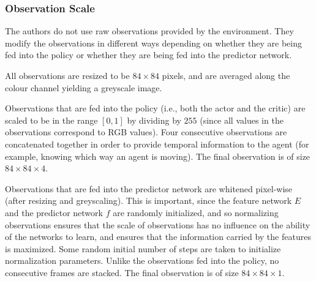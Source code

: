 \documentclass[journal, onecolumn, 12pt, draftclsnofoot]{IEEEtran}
\begin{document}
	\subsubsection{Observation Scale}
	\par The authors do not use raw observations provided by the environment. They modify the observations in different ways depending on whether they are being fed into the policy or whether they are being fed into the predictor network.
	\par All observations are resized to be $84 \times 84$ pixels, and are averaged along the colour channel yielding a greyscale image.
	\par Observations that are fed into the policy (i.e., both the actor and the critic) are scaled to be in the range $[0, 1]$ by dividing by $255$ (since all values in the observations correspond to RGB values). Four consecutive observations are concatenated together in order to provide temporal information to the agent (for example, knowing which way an agent is moving). The final observation is of size $84 \times 84 \times 4$.
	\par Observations that are fed into the predictor network are whitened pixel-wise (after resizing and greyscaling). This is important, since the feature network $E$ and the predictor network $f$ are randomly initialized, and so normalizing observations ensures that the scale of observations has no influence on the ability of the networks to learn, and ensures that the information carried by the features is maximized. Some random initial number of steps are taken to initialize normalization parameters. Unlike the observations fed into the policy, no consecutive frames are stacked. The final observation is of size $84 \times 84 \times 1$.
\end{document}
